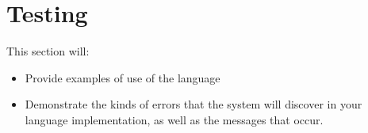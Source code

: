 \chapter{Testing} %
\label{cha:testing}
This section will:
\begin{itemize}
    \item Provide examples of use of the language
    \item Demonstrate the kinds of errors that the system will discover in your language implementation, as well as the messages that occur. 
\end{itemize}

